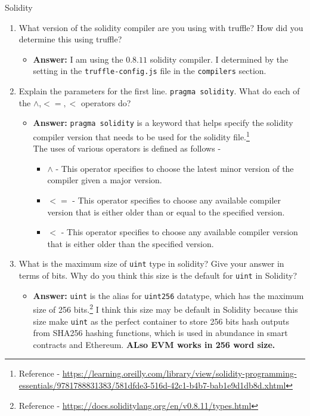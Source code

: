 \documentclass[11pt]{article}
\begin{document}
Solidity
\begin{enumerate}
	\item What version of the solidity compiler are you using with truffle? How did you determine this using truffle?
	\begin{itemize}
	    \item \textbf{Answer:} I am using the $0.8.11$ solidity compiler. I determined by the setting in the \texttt{truffle-config.js} file in the \texttt{compilers} section.
	\end{itemize}
	\item Explain the parameters for the first line. \texttt{pragma solidity}. What do each of the $\wedge$,$<=,<$ operators do?
	\begin{itemize}
	    \item \textbf{Answer:} \texttt{pragma solidity} is a keyword that helps specify the solidity compiler version that needs to be used for the solidity file.\footnote{Reference - \url{https://learning.oreilly.com/library/view/solidity-programming-essentials/9781788831383/581dfde3-516d-42c1-b4b7-bab1e9d1db8d.xhtml}}\\
	    The uses of various operators is defined as follows -
	    \begin{itemize}
	        \item $\wedge$ - This operator specifies to choose the latest minor version of the compiler given a major version.
	        \item $<=$ - This operator specifies to choose any available compiler version that is either older than or equal to the specified version.
	        \item $<$ - This operator specifies to choose any available compiler version that is either older than the specified version.
	    \end{itemize}
	\end{itemize}
	
	\item What is the maximum size of \texttt{uint} type in solidity? Give your answer in terms of bits. Why do you think this size is the default for \texttt{uint} in Solidity?
	\begin{itemize}
	    \item \textbf{Answer: } \texttt{uint} is the alias for \texttt{uint256} datatype, which has the maximum size of 256 bits.\footnote{Reference - \url{https://docs.soliditylang.org/en/v0.8.11/types.html}} I think this size may be default in Solidity because this size make \texttt{uint} as the perfect container to store 256 bits hash outputs from SHA256 hashing functions, which is used in abundance in smart contracts and Ethereum. \textbf{ALso EVM works in 256 word size.}
	\end{itemize}
	

\end{enumerate}
\end{document}

